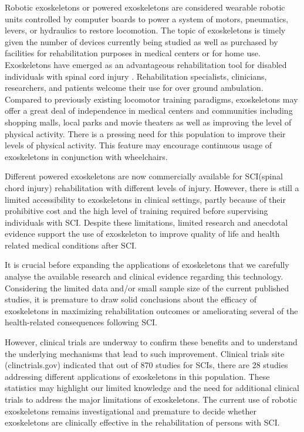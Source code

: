 \documentclass[a4paper,12pt]{article}
\begin{document}
Robotic exoskeletons or powered exoskeletons are considered wearable robotic units controlled by computer boards to power a system of motors, pneumatics, levers, or hydraulics to restore locomotion. The topic of exoskeletons is timely given the number of devices currently being studied as well as purchased by facilities for rehabilitation purposes in medical centers or for home use. Exoskeletons have emerged as an advantageous rehabilitation tool for disabled individuals with spinal cord injury . Rehabilitation specialists, clinicians, researchers, and patients welcome their use for over ground ambulation. Compared to previously existing locomotor training paradigms, exoskeletons may offer a great deal of independence in medical centers and communities including shopping malls, local parks and movie theaters as well as improving the level of physical activity. There is a pressing need for this population to improve their levels of physical activity. This feature may encourage continuous usage of exoskeletons in conjunction with wheelchairs.

Different powered exoskeletons are now commercially available for SCI(spinal chord injury) rehabilitation with different levels of injury. However, there is still a limited accessibility to exoskeletons in clinical settings, partly because of their prohibitive cost and the high level of training required before supervising individuals with SCI. Despite these limitations, limited research and anecdotal evidence support the use of exoskeleton to improve quality of life and health related medical conditions after SCI.

 It is crucial before expanding the applications of exoskeletons that we carefully analyse the available research and clinical evidence regarding this technology. Considering the limited data and/or small sample size of the current published studies, it is premature to draw solid conclusions about the efficacy of exoskeletons in maximizing rehabilitation outcomes or ameliorating several of the health-related consequences following SCI.

However, clinical trials are underway to confirm these benefits and to understand the underlying mechanisms that lead to such improvement. Clinical trials site (clinctrials.gov) indicated that out of 870 studies for SCIs, there are 28 studies addressing different applications of exoskeletons in this population. These statistics may highlight our limited knowledge and the need for additional clinical trials to address the major limitations of exoskeletons. The current use of robotic exoskeletons remains investigational and premature to decide whether exoskeletons are clinically effective in the rehabilitation of persons with SCI.
\end{document}
